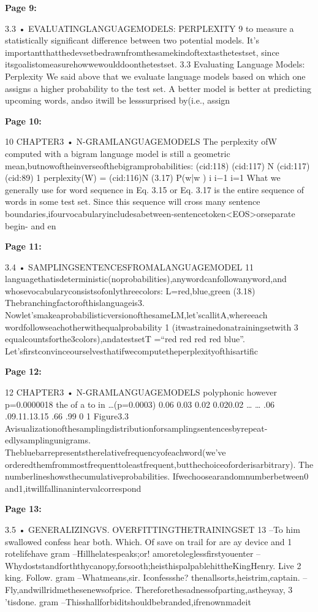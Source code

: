 \documentclass[11pt,a4paper]{article}
\begin{document}
\textbf{Page 9:}

3.3 • EVALUATINGLANGUAGEMODELS: PERPLEXITY 9
to measure a statistically significant difference between two potential models. It’s
importantthatthedevsetbedrawnfromthesamekindoftextasthetestset, since
itsgoalistomeasurehowwewoulddoonthetestset.
3.3 Evaluating Language Models: Perplexity
We said above that we evaluate language models based on which one assigns a
higher probability to the test set. A better model is better at predicting upcoming
words, andso itwill be lesssurprised by(i.e., assign 

\textbf{Page 10:}

10 CHAPTER3 • N-GRAMLANGUAGEMODELS
The perplexity ofW computed with a bigram language model is still a geometric
mean,butnowoftheinverseofthebigramprobabilities:
(cid:118)
(cid:117) N
(cid:117)(cid:89) 1
perplexity(W) = (cid:116)N (3.17)
P(w|w )
i i−1
i=1
What we generally use for word sequence in Eq. 3.15 or Eq. 3.17 is the entire
sequence of words in some test set. Since this sequence will cross many sentence
boundaries,ifourvocabularyincludesabetween-sentencetoken<EOS>orseparate
begin- and en

\textbf{Page 11:}

3.4 • SAMPLINGSENTENCESFROMALANGUAGEMODEL 11
languagethatisdeterministic(noprobabilities),anywordcanfollowanyword,and
whosevocabularyconsistsofonlythreecolors:
L={red,blue,green} (3.18)
Thebranchingfactorofthislanguageis3.
Nowlet’smakeaprobabilisticversionofthesameLM,let’scallitA,whereeach
wordfollowseachotherwithequalprobability 1 (itwastrainedonatrainingsetwith
3
equalcountsforthe3colors),andatestsetT =“red red red red blue”.
Let’sfirstconvinceourselvesthatifwecomputetheperplexityofthisartific

\textbf{Page 12:}

12 CHAPTER3 • N-GRAMLANGUAGEMODELS
polyphonic
however p=0.0000018
the of a to in …(p=0.0003)
0.06 0.03 0.02 0.020.02
… …
.06 .09.11.13.15 .66 .99
0 1
Figure3.3 Avisualizationofthesamplingdistributionforsamplingsentencesbyrepeat-
edlysamplingunigrams. Thebluebarrepresentstherelativefrequencyofeachword(we’ve
orderedthemfrommostfrequenttoleastfrequent,butthechoiceoforderisarbitrary). The
numberlineshowsthecumulativeprobabilities. Ifwechoosearandomnumberbetween0
and1,itwillfallinanintervalcorrespond

\textbf{Page 13:}

3.5 • GENERALIZINGVS. OVERFITTINGTHETRAININGSET 13
–To him swallowed confess hear both. Which. Of save on trail for are ay device and
1
rotelifehave
gram –Hillhelatespeaks;or! amoretoleglessfirstyouenter
–Whydoststandforththycanopy,forsooth;heisthispalpablehittheKingHenry. Live
2
king. Follow.
gram –Whatmeans,sir. Iconfessshe? thenallsorts,heistrim,captain.
–Fly,andwillridmethesenewsofprice. Thereforethesadnessofparting,astheysay,
3
’tisdone.
gram –Thisshallforbiditshouldbebranded,ifrenownmadeit
\end{document}
